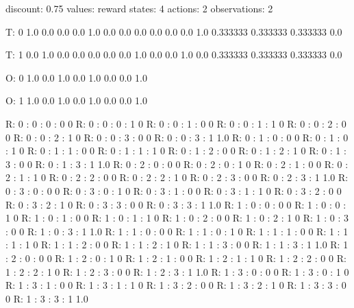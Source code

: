 discount: 0.75
values: reward
states: 4
actions: 2
observations: 2

T: 0
1.0 0.0 0.0 0.0
1.0 0.0 0.0 0.0
0.0 0.0 0.0 1.0
0.333333 0.333333 0.333333 0.0

T: 1
0.0 1.0 0.0 0.0
0.0 0.0 0.0 1.0
0.0 0.0 1.0 0.0
0.333333 0.333333 0.333333 0.0

O: 0
1.0 0.0
1.0 0.0
1.0 0.0
0.0 1.0

O: 1
1.0 0.0
1.0 0.0
1.0 0.0
0.0 1.0

R: 0 : 0 : 0 : 0 0
R: 0 : 0 : 0 : 1 0
R: 0 : 0 : 1 : 0 0
R: 0 : 0 : 1 : 1 0
R: 0 : 0 : 2 : 0 0
R: 0 : 0 : 2 : 1 0
R: 0 : 0 : 3 : 0 0
R: 0 : 0 : 3 : 1 1.0
R: 0 : 1 : 0 : 0 0
R: 0 : 1 : 0 : 1 0
R: 0 : 1 : 1 : 0 0
R: 0 : 1 : 1 : 1 0
R: 0 : 1 : 2 : 0 0
R: 0 : 1 : 2 : 1 0
R: 0 : 1 : 3 : 0 0
R: 0 : 1 : 3 : 1 1.0
R: 0 : 2 : 0 : 0 0
R: 0 : 2 : 0 : 1 0
R: 0 : 2 : 1 : 0 0
R: 0 : 2 : 1 : 1 0
R: 0 : 2 : 2 : 0 0
R: 0 : 2 : 2 : 1 0
R: 0 : 2 : 3 : 0 0
R: 0 : 2 : 3 : 1 1.0
R: 0 : 3 : 0 : 0 0
R: 0 : 3 : 0 : 1 0
R: 0 : 3 : 1 : 0 0
R: 0 : 3 : 1 : 1 0
R: 0 : 3 : 2 : 0 0
R: 0 : 3 : 2 : 1 0
R: 0 : 3 : 3 : 0 0
R: 0 : 3 : 3 : 1 1.0
R: 1 : 0 : 0 : 0 0
R: 1 : 0 : 0 : 1 0
R: 1 : 0 : 1 : 0 0
R: 1 : 0 : 1 : 1 0
R: 1 : 0 : 2 : 0 0
R: 1 : 0 : 2 : 1 0
R: 1 : 0 : 3 : 0 0
R: 1 : 0 : 3 : 1 1.0
R: 1 : 1 : 0 : 0 0
R: 1 : 1 : 0 : 1 0
R: 1 : 1 : 1 : 0 0
R: 1 : 1 : 1 : 1 0
R: 1 : 1 : 2 : 0 0
R: 1 : 1 : 2 : 1 0
R: 1 : 1 : 3 : 0 0
R: 1 : 1 : 3 : 1 1.0
R: 1 : 2 : 0 : 0 0
R: 1 : 2 : 0 : 1 0
R: 1 : 2 : 1 : 0 0
R: 1 : 2 : 1 : 1 0
R: 1 : 2 : 2 : 0 0
R: 1 : 2 : 2 : 1 0
R: 1 : 2 : 3 : 0 0
R: 1 : 2 : 3 : 1 1.0
R: 1 : 3 : 0 : 0 0
R: 1 : 3 : 0 : 1 0
R: 1 : 3 : 1 : 0 0
R: 1 : 3 : 1 : 1 0
R: 1 : 3 : 2 : 0 0
R: 1 : 3 : 2 : 1 0
R: 1 : 3 : 3 : 0 0
R: 1 : 3 : 3 : 1 1.0

